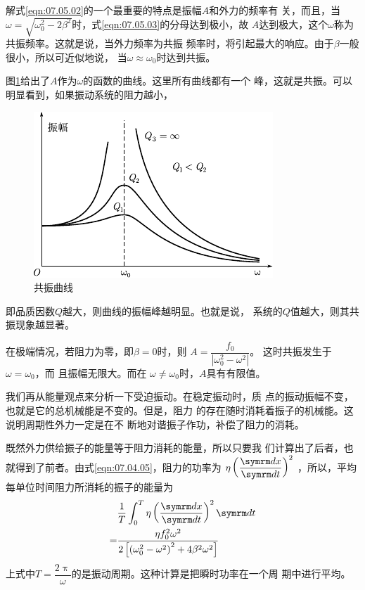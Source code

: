 解式\eqref{eqn:07.05.02}的一个最重要的特点是振幅$ A $和外力的频率有
关，而且，当$ \omega = \sqrt { \omega _ { 0 } ^ { 2 } - 2 \beta ^ { 2 } } $时，式\eqref{eqn:07.05.03}的分母达到极小，故
$ A $达到极大，这个$ \omega $称为共振频率。这就是说，当外力频率为共振
频率时，将引起最大的响应。由于$ \beta $一般很小，所以可近似地说，
当$ \omega \approx \omega _ { 0 } $时达到共振。

图\ref{fig:07.09}\;给出了$ A $作为$ \omega $的函数的曲线。这里所有曲线都有一个
峰，这就是共振。可以明显看到，如果振动系统的阻力越小，
\clearpage\noindent
\begin{figure}
    \centering
    \includegraphics{figure/fig07.09}
    \caption{共振曲线}
    \label{fig:07.09}
\end{figure}
即品质因数$ Q $越大，则曲线的振幅峰越明显。也就是说，
系统的$ Q $值越大，则其共振现象越显著。

在极端情况，若阻力为零，即$ \beta = 0 $时，则
$ A = \dfrac { f _ { 0 } } { \left| \omega_{ 0 } ^ { 2 } - \omega ^ { 2 } \right| } $。
这时共振发生于$ \omega = \omega _ { 0 } $，而
且振幅无限大。而在
$ \omega \ne \omega _ { 0 } $时，$ A $具有有限值。

我们再从能量观点来分析一下受迫振动。在稳定振动时，质
点的振动振幅不变，也就是它的总机械能是不变的。但是，阻力
的存在随时消耗着振子的机械能。这说明周期性外力一定是在不
断地对谐振子作功，补偿了阻力的消耗。

既然外力供给振子的能量等于阻力消耗的能量，所以只要我
们计算出了后者，也就得到了前者。由式\eqref{eqn:07.04.05}，阻力的功率为
$ \eta \left( \dfrac { \dif x } { \dif t } \right) ^ { 2 } $
，所以，平均每单位时间阻力所消耗的振子的能量为
\begin{equation}\label{eqn:07.05.06}
    \begin{aligned}
        &\frac { 1 } { T } \int _ { 0 } ^ { T } \eta  \left( \frac { \dif x } { \dif t } \right) ^ { 2 } \dif t \\
     = &\frac { \eta f _ { 0 } ^ { 2 } \omega ^ { 2 } } { 2 \left[ \left( \omega_{ 0 } ^ { 2 } - \omega ^ { 2 } \right) ^ { 2 } + 4 \beta ^ { 2 } \omega ^ { 2 } \right] }
    \end{aligned}
\end{equation}
上式中$ T = \dfrac { 2 \uppi } { \omega } $的是振动周期。这种计算是把瞬时功率在一个周
期中进行平均。

